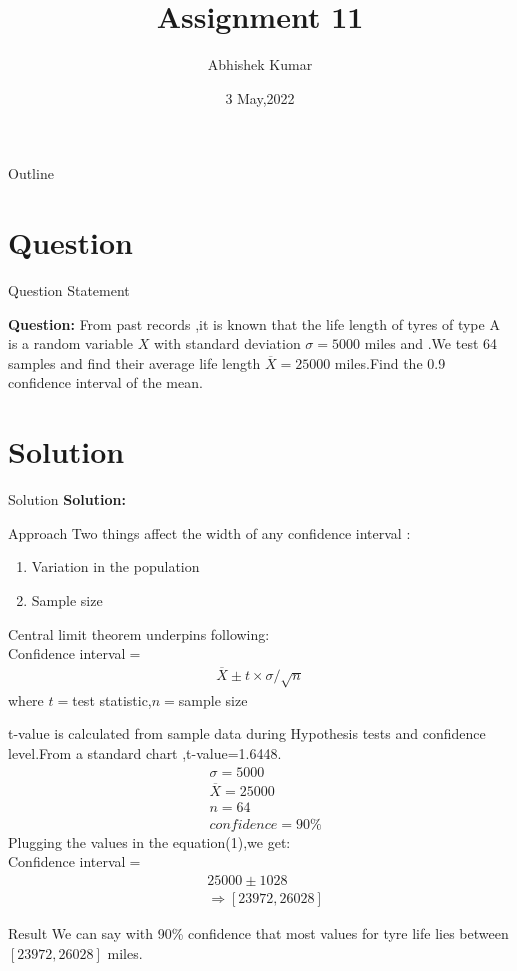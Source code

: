 \documentclass{beamer}
\title{Assignment 11}
\author{Abhishek Kumar}
\institute{IIT Hyderabad}
\date{3 May,2022}
\begin{document}
	\begin{frame}
		\titlepage
	\end{frame}
	\begin{frame}{Outline}
		\tableofcontents
	\end{frame}
	\section{Question}
	\begin{frame}{Question Statement}
		
		\textbf{Question:} From past records ,it is known that the life length of tyres of type A is a random variable $X$  with standard deviation $\sigma=5000$ miles  and .We test  64 samples and find their average life length $\overline X=25000$ miles.Find the 0.9 confidence interval of the mean.
	\end{frame}
	\section{Solution}
	\begin{frame}{Solution}
		\textbf{Solution:}
		
		\begin{alertblock}{Approach}
			Two things affect the width of any confidence interval :
			\begin{enumerate}
				\item Variation in the population
				\item Sample size
			\end{enumerate}
		\end{alertblock}
		Central limit theorem underpins following:\\
		Confidence interval$=$
		\begin{align}
			\overline X \pm t \times \sigma/ \sqrt{n}
		\end{align}
		where $t=$test statistic,$n=$sample size
	\end{frame}
	\begin{frame}
		t-value is calculated from sample data during Hypothesis tests and confidence level.From a standard chart ,t-value=1.6448. 
		\begin{align}
			&\sigma =5000\\
			&\overline X=25000\\
			&n=64\\
			&confidence=90\%
		\end{align}
		Plugging the values in the equation(1),we get:\\
		Confidence interval$=$
		\begin{align}
			&25000 \pm 1028\nonumber\\
			&\Rightarrow [23972,26028]\nonumber
		\end{align}
		\begin{alertblock}{Result}
			We can say with 90\% confidence that most values for tyre life lies between $[23972,26028]$ miles.
		\end{alertblock}
	\end{frame}
	
\end{document}
